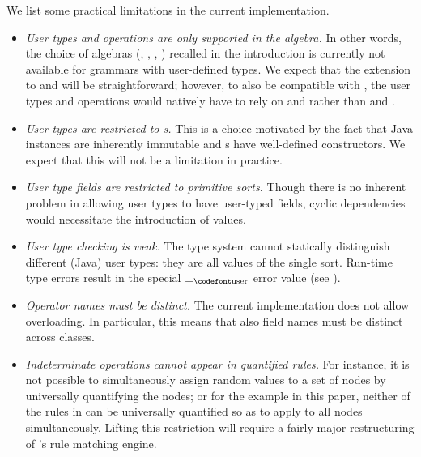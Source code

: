 We list some practical limitations in the current \GROOVE implementation.
%
\begin{itemize}
\item \emph{User types and operations are only supported in the \javaA algebra.} In other words, the choice of algebras (\termA, \bigA, \javaA, \pointA) recalled in the introduction is currently not available for grammars with user-defined types. We expect that the extension to \termA and \pointA will be straightforward; however, to also be compatible with \bigA, the user types and operations would natively have to rely on  and  rather than \intT and \doubleT.

\item \emph{User types are restricted to \recordT{}s.} This is a choice motivated by the fact that Java \recordT instances are inherently immutable and \recordT{}s have well-defined constructors. We expect that this will not be a limitation in practice.

\item \emph{User type fields are restricted to primitive sorts.} Though there is no inherent problem in allowing user types to have user-typed fields, cyclic dependencies would necessitate the introduction of \nullT values.

\item \emph{User type checking is weak.} The \GROOVE type system cannot statically distinguish different (Java) user types: they are all values of the single \userS sort. Run-time type errors result in the special $\bot_\userS$ error value (see ).

\item \emph{Operator names must be distinct.} The current implementation does not allow overloading. In particular, this means that also field names must be distinct across \UserType classes.

\item \emph{Indeterminate operations cannot appear in quantified rules.} For instance, it is not possible to simultaneously assign random values to a set of nodes by universally quantifying the nodes; or for the example in this paper, neither of the rules in  can be universally quantified so as to apply to all  nodes simultaneously.
Lifting this restriction will require a fairly major restructuring of \GROOVE's rule matching engine.
\end{itemize}


